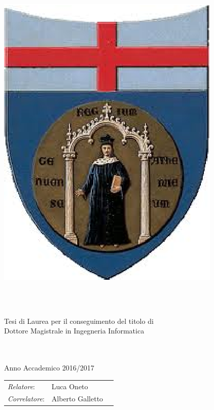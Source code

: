 \documentclass[
11pt, %
oneside, %
english, %
onehalfspacing, %
headsepline, %
chapterinoneline, %
]{MastersDoctoralThesis} %
\author{Federico \textsc{D'Ambrosio}, Edoardo \textsc{Ferrante}} %
\begin{document}
\hypersetup{colorlinks, urlcolor=blue, linkcolor=blue}

\frontmatter %

\pagestyle{plain} %


\begin{titlepage}
\thispagestyle{empty}
\begin{center}
	\includegraphics[width=0.2\linewidth]{Figures/unige.eps}
\end{center}

\begin{center}
	\LARGE\sc
	\univname\\
	
	\vspace{0.5cm}
	\large
	\degreename\\
\end{center}

\begin{center}
	\small
	Tesi di Laurea per il conseguimento del titolo di\\
	Dottore Magistrale in Ingegneria Informatica\\
\end{center}

\vfill

\begin{center} 
	\LARGE
	{\bf \ttitle}\\
	\vspace{0.5cm}
	\large
	\authorname\\
	\vspace{0.5cm}
	\small
	Anno Accademico 2016/2017
\end{center}

\vfill

\begin{tabular}{lll}%
	{\em Relatore}:	& Luca Oneto\\
    {\em Correlatore}: & Alberto Galletto\\
\end{tabular} 

\hfill


\end{titlepage}
\end{document}
